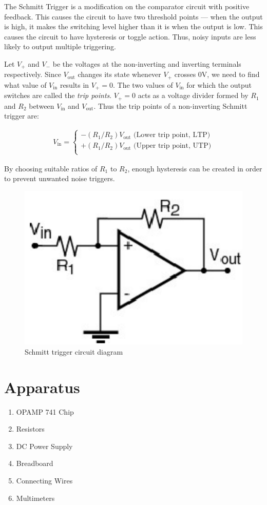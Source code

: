 The Schmitt Trigger is a modification on the comparator circuit with positive feedback. This causes the circuit to have two threshold points --- when the output is high, it makes the switching level higher than it is when the output is low. This causes the circuit to have hysteresis or toggle action.
Thus, noisy inputs are less likely to output multiple triggering.

Let $V_+$ and $V_-$ be the voltages at the non-inverting and inverting terminals respectively.
Since $V_\text{out}$ changes its state whenever $V_+$ crosses 0V, we need to find what value of $V_\text{in}$ results in $V_+ = 0$. The two values of $V_\text{in}$ for which the output switches are called the \textit{trip points}. $V_+ = 0$ acts as a voltage divider formed by $R_1$ and $R_2$ between $V_\text{in}$ and $V_\text{out}$. Thus the trip points of a non-inverting Schmitt trigger are: 

\begin{align}
    V_\text{in} = \begin{cases}
        -(R_1/R_2)V_\text{out} \text{ (Lower trip point, LTP)}\\
        +(R_1/R_2)V_\text{out} \text{ (Upper trip point, UTP)}\\
    \end{cases}
\end{align}

By choosing suitable ratios of $R_1$ to $R_2$, enough hysteresis can be created in order to prevent unwanted noise triggers. 

\begin{figure}[H]
    \centering
    \includegraphics[width=0.5\columnwidth]{images/schmitt.png}
    \caption{Schmitt trigger circuit diagram}
    \label{schmitt}
\end{figure}

\section{Apparatus}

\begin{enumerate}
    \item OPAMP 741 Chip
    \item Resistors
    \item DC Power Supply
    \item Breadboard
    \item Connecting Wires
    \item Multimeters
\end{enumerate}